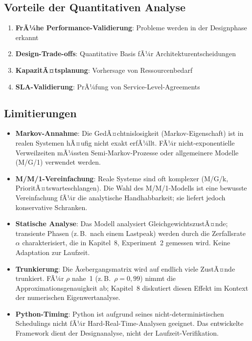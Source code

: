 ﻿\documentclass[a4paper,12pt]{scrreprt}
\theoremstyle{definition}
\begin{document}
\subsection{Vorteile der Quantitativen Analyse}

\begin{enumerate}
	\item[-] \textbf{FrÃ¼he Performance-Validierung}: Probleme werden in der Designphase erkannt
	\item[-] \textbf{Design-Trade-offs}: Quantitative Basis fÃ¼r Architekturentscheidungen
	\item[-] \textbf{KapazitÃ¤tsplanung}: Vorhersage von Ressourcenbedarf
	\item[-] \textbf{SLA-Validierung}: PrÃ¼fung von Service-Level-Agreements
\end{enumerate}

\subsection{Limitierungen}

\begin{itemize}
	\item[-] \textbf{Markov-Annahme}: Die GedÃ¤chtnislosigkeit (Markov-Eigenschaft)
	ist in realen Systemen hÃ¤ufig nicht exakt erfÃ¼llt.  FÃ¼r
	nicht-exponentielle Verweilzeiten mÃ¼ssten Semi-Markov-Prozesse
	oder allgemeinere Modelle (M/G/1) verwendet werden.
	
	\item[-] \textbf{M/M/1-Vereinfachung}: Reale Systeme sind oft komplexer
	(M/G/k, PrioritÃ¤tswarteschlangen).  Die Wahl des M/M/1-Modells
	ist eine bewusste Vereinfachung fÃ¼r die analytische
	Handhabbarkeit; sie liefert jedoch konservative Schranken.
	
	\item[-] \textbf{Statische Analyse}: Das Modell analysiert
	GleichgewichtszustÃ¤nde; transiente Phasen (z.\,B.\ nach einem
	Lastpeak) werden durch die Zerfallsrate~$\alpha$ charakterisiert,
	die in Kapitel~8, Experiment~2 gemessen wird.  Keine Adaptation
	zur Laufzeit.
	
	\item[-] \textbf{Trunkierung}: Die Ãœbergangsmatrix wird auf endlich viele
	ZustÃ¤nde trunkiert.  FÃ¼r $\rho$ nahe~1 (z.\,B.\ $\rho = 0{,}99$)
	nimmt die Approximationsgenauigkeit ab; Kapitel~8 diskutiert
	diesen Effekt im Kontext der numerischen Eigenwertanalyse.
	
	\item[-] \textbf{Python-Timing}: Python ist aufgrund seines
	nicht-deterministischen Schedulings nicht fÃ¼r Hard-Real-Time-Analysen
	geeignet.  Das entwickelte Framework dient der Designanalyse, nicht
	der Laufzeit-Verifikation.
\end{itemize}
\end{document}
